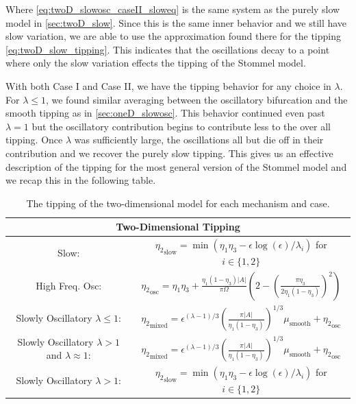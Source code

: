 Where \eqref{eq:twoD_slowosc_caseII_sloweq} is the same system as the purely slow model in \autoref{sec:twoD_slow}. Since this is the same inner behavior and we still have slow variation, we are able to use the approximation found there for the tipping \eqref{eq:twoD_slow_tipping}. This indicates that the oscillations decay to a point where only the slow variation effects the tipping of the Stommel model.

With both Case I and Case II, we have the tipping behavior for any choice in $\lambda$. For $\lambda\le1$, we found similar averaging between the oscillatory bifurcation and the smooth tipping as in \autoref{sec:oneD_slowosc}. This behavior continued even past $\lambda=1$ but the oscillatory contribution begins to contribute less to the over all tipping. Once $\lambda$ was sufficiently large, the oscillations all but die off in their contribution and we recover the purely slow tipping. This gives us an effective description of the tipping for the most general version of the Stommel model and we recap this in the following table.

\begin{table}[H]
\begin{center}
\begin{tabular}{|c|c|}
\hline 
 \multicolumn{2}{|c|}{Two-Dimensional Tipping} \\ 
\hline
Slow: & ${\eta_2}_{\text{slow}}=\min(\eta_1\eta_3 -\epsilon\log(\epsilon)/\lambda_i)$ for $i\in\{1,2\}$ \\ 
\hline 
High Freq. Osc: & ${\eta_2}_{\text{osc}}=\eta_1\eta_3+\frac{\eta_1(1-\eta_3)|A|}{\pi\Omega}\left(2-\left(\frac{\pi\eta_3}{2\eta_1(1-\eta_3)}\right)^2\right)$ \\ 
\hline 
Slowly Oscillatory $\lambda\le 1$: & ${\eta_2}_{\text{mixed}}=\epsilon^{(\lambda-1)/3}\left(\frac{\pi |A|}{\eta_1(1-\eta_3)}\right)^{1/3} \mu_{\text{smooth}}+{\eta_2}_{\text{osc}}$ \\ 
\hline 
Slowly Oscillatory $\lambda >1$ and $\lambda \approx 1$: &${\eta_2}_{\text{mixed}}=\epsilon^{(\lambda-1)/3}\left(\frac{\pi |A|}{\eta_1(1-\eta_3)}\right)^{1/3} \mu_{\text{smooth}}+{\eta_2}_{\text{osc}}$ \\ 
\hline 
Slowly Oscillatory $\lambda>1$:
 & ${\eta_2}_{\text{slow}}=\min(\eta_1\eta_3 -\epsilon\log(\epsilon)/\lambda_i)$ for $i\in\{1,2\}$ \\
\hline
\end{tabular} 
\caption{The tipping of the two-dimensional model for each mechanism and case.}
\end{center}
\end{table}

